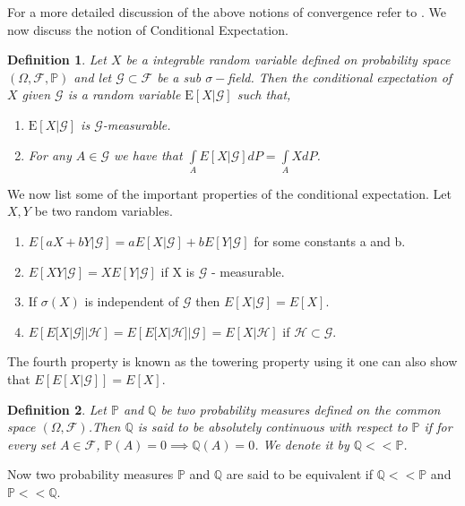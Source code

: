 \documentclass[12pt]{report}
\newtheorem{definition}{Definition}[section]
\newcommand{\E}{\mathrm{E}}
\begin{document}
For a more detailed discussion of the above notions of convergence refer to \cite{klenke_2020}.
We now discuss the notion of Conditional Expectation.
\begin{definition}
Let $X$ be a integrable random variable defined on probability space $(\Omega,\mathcal{F},\mathbb{P})$ and let $\mathcal{G} \subset \mathcal{F}$ be a sub $\sigma-$field. Then the conditional expectation of $X$ given $\mathcal{G}$ is a random variable $\E[X|\mathcal{G}]$ such that, 
\begin{enumerate}
    \item $\E[X|\mathcal{G}]$ is $\mathcal{G}$-measurable.
    \item For any $A \in \mathcal{G}$ we have that $\int\limits_A E[X|\mathcal{G}]dP   =\int\limits_A XdP$.
\end{enumerate}
\end{definition}
We now list some of the important properties of the conditional expectation. Let $X,Y$ be two random variables.\\
\vspace{-1cm}
\begin{enumerate}
    \item $E[aX+bY|\mathcal{G}] = aE[X|\mathcal{G}] + bE[Y|\mathcal{G}]$ for some constants a and b.
    \item $E[XY|\mathcal{G}] = XE[Y|\mathcal{G}]$ if X is $ \mathcal{G}$ - measurable.
    \item If $\sigma(X)$ is independent of $\mathcal{G}$ then $E[X|\mathcal{G}] = E[X].$
    \item $E\left[E[X|\mathcal{G}]|\mathcal{H}\right] = E\left[E[X|\mathcal{H}]|\mathcal{G}\right]=  E[X|\mathcal{H}]   $ if $ \mathcal{H} \subset \mathcal{G}. $
\end{enumerate}
The fourth property is known as the towering property using it one can also show that $E\left[E[X|\mathcal{G}]\right] = E[X]$.

\begin{definition}
Let $\mathbb{P}$ and  $\mathbb{Q}$ be two probability measures defined on the common space $(\Omega, \mathcal{F})$.Then $\mathbb{Q}$ is said to be absolutely continuous with respect to $\mathbb{P}$ if for every set $A \in \mathcal{F}$, $\mathbb{P}(A)=0 \implies \mathbb{Q}(A)=0$. We denote it by $\mathbb{Q} << \mathbb{P}$.
\end{definition}
Now two probability measures $\mathbb{P}$ and $\mathbb{Q}$ are said to be equivalent if $\mathbb{Q} << \mathbb{P}$ and $\mathbb{P} << \mathbb{Q}$. 
\end{document}
